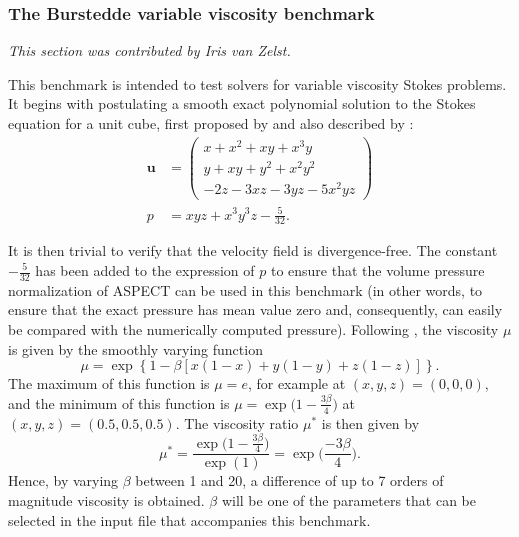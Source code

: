 \documentclass{article}
\newcommand{\aspect}{\textsc{ASPECT}}
\begin{document}



\subsubsection{The Burstedde variable viscosity benchmark}
\label{sec:benchmark-burstedde}

\textit{This section was contributed by Iris van Zelst.}

This benchmark is intended to test solvers for variable viscosity Stokes
problems. It begins with postulating a smooth exact polynomial solution to the Stokes equation for a unit cube, first proposed by \cite{dobo04} and also described by \cite{busa13}:
\begin{align}
  {\mathbf u} &= \left( \begin{array}{c}
      x+x^2+xy+x^3y \\
      y + xy + y^2 + x^2 y^2\\
      -2z - 3xz - 3yz - 5x^2 yz
    \end{array}
  \right)
  \label{eq:burstedde-velocity}
  \\
  p &= xyz + x^3 y^3z - \frac{5}{32}.
  \label{eq:burstedde-pressure}
\end{align}

It is then trivial to verify that the velocity field is divergence-free. The
constant $-\frac{5}{32}$ has been added to the expression of $p$ to ensure
that the volume pressure normalization of \aspect{} can be used in this
benchmark (in other words, to ensure that the exact pressure has mean value
zero and, consequently, can easily be compared with the numerically computed
pressure). Following \cite{busa13}, the viscosity $\mu$ is given by the smoothly varying function 
\begin{equation}
  \mu = \exp\left\{1 - \beta\left[x (1-x) + y(1-y) + z(1-z)\right]\right\}.
  \label{eq:burstedde-mu}
\end{equation}
The maximum of this function is $\mu = e$, for example at $(x,y,z)=(0,0,0)$, and the minimum of this function is $\mu = \exp \Big( 1-\frac{3\beta}{4}\Big)$ at $(x,y,z) = (0.5,0.5,0.5)$. The viscosity ratio $\mu^\ast$ is then given by 
\begin{equation}
  \mu^\ast = \frac{\exp\Big(1-\frac{3\beta}{4}\Big)}{\exp(1)} = \exp\Big(\frac{-3\beta}{4}\Big).
\end{equation}
Hence, by varying $\beta$ between 1 and 20, a difference of up to 7 orders of
magnitude viscosity is obtained. $\beta$ will be one of the parameters that
can be selected in the input file that accompanies this benchmark.
\end{document}
